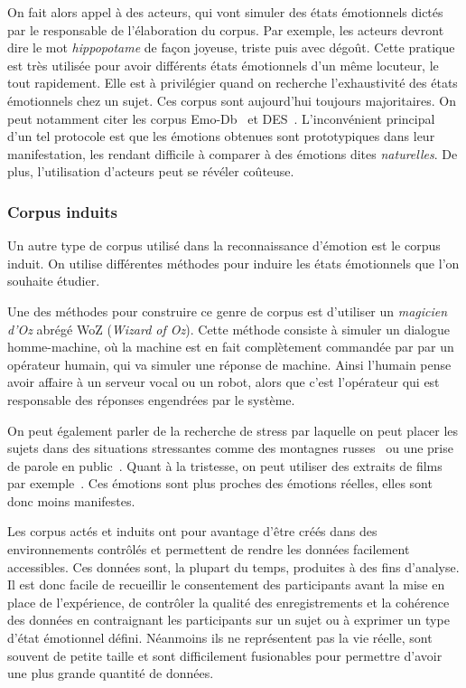 On fait alors appel à des acteurs, qui vont simuler des états émotionnels dictés par le responsable de l'élaboration du corpus. Par exemple, les acteurs devront dire le mot \textit{hippopotame} de façon joyeuse, triste puis avec dégoût. Cette pratique est très utilisée pour avoir différents états émotionnels d'un même locuteur, le tout rapidement. Elle est à privilégier quand on recherche l'exhaustivité des états émotionnels chez un sujet. Ces corpus sont aujourd'hui toujours majoritaires. On peut notamment citer les corpus Emo-Db~\cite{Burkhardt2005} et DES~\cite{Engberg1997}. L'inconvénient principal d'un tel protocole est que les émotions obtenues sont prototypiques dans leur manifestation, les rendant difficile à comparer à des émotions dites \textit{naturelles}. De plus, l'utilisation d'acteurs peut se révéler coûteuse.

\subsubsection{Corpus induits}
Un autre type de corpus utilisé dans la reconnaissance d'émotion est le corpus induit. On utilise différentes méthodes pour induire les états émotionnels que l'on souhaite étudier.

Une des méthodes pour construire ce genre de corpus est d'utiliser un \textit{magicien d'Oz} abrégé WoZ (\textit{Wizard of Oz}). Cette méthode consiste à simuler un dialogue homme-machine, où la machine est en fait complètement commandée par par un opérateur humain, qui va simuler une réponse de machine. Ainsi l'humain pense avoir affaire à un serveur vocal ou un robot, alors que c'est l'opérateur qui est responsable des réponses engendrées par le système.

On peut également parler de la recherche de stress par laquelle on peut placer les sujets dans des situations stressantes comme des montagnes russes~\cite{Hansen1997} ou une prise de parole en public~\cite{Giraud2013}. Quant à la tristesse, on peut utiliser des extraits de films par exemple~\cite{Schuller2010cinemo}. Ces émotions sont plus proches des émotions réelles, elles sont donc moins manifestes.

Les corpus actés et induits ont pour avantage d'être créés dans des environnements contrôlés et permettent de rendre les données facilement accessibles. Ces données sont, la plupart du temps, produites à des fins d'analyse. Il est donc facile de recueillir le consentement des participants avant la mise en place de l'expérience, de contrôler la qualité des enregistrements et la cohérence des données en contraignant les participants sur un sujet ou à exprimer un type d'état émotionnel défini. Néanmoins ils ne représentent pas la vie réelle, sont souvent de petite taille et sont difficilement fusionables pour permettre d'avoir une plus grande quantité de données.

